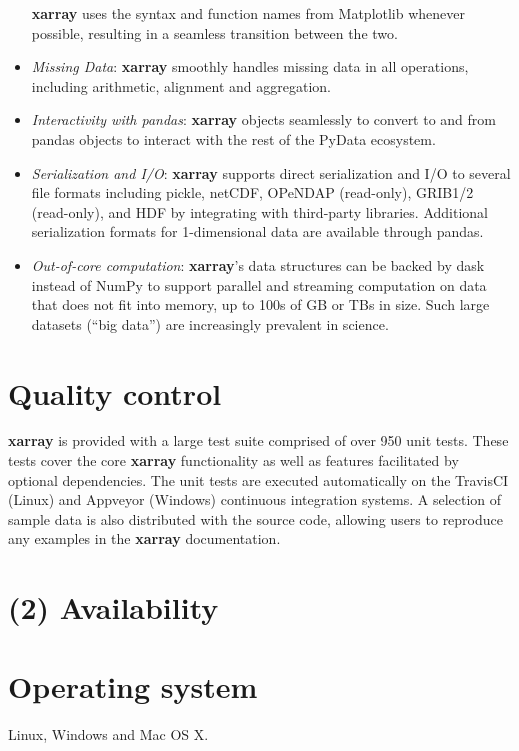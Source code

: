 \documentclass{jors}
\begin{document}
\begin{itemize}
	\textbf{xarray} uses the syntax and function names from Matplotlib whenever possible, resulting in a seamless transition between the two.
	\item \textit{Missing Data}: \textbf{xarray} smoothly handles missing data in all operations, including arithmetic, alignment and aggregation.
	\item \textit{Interactivity with pandas}: \textbf{xarray} objects seamlessly to convert to and from pandas objects to interact with the rest of the PyData ecosystem.
	\item \textit{Serialization and I/O}: \textbf{xarray} supports direct serialization and I/O to several file formats including pickle, netCDF, OPeNDAP (read-only), GRIB1/2 (read-only), and HDF by integrating with third-party libraries.
	Additional serialization formats for 1-dimensional data are available through pandas.
	\item \textit{Out-of-core computation}: \textbf{xarray}'s data structures can be backed by dask \cite{dask} instead of NumPy to support parallel and streaming computation on data that does not fit into memory, up to 100s of GB or TBs in size. Such large datasets (``big data'') are increasingly prevalent in science.
\end{itemize}

\section*{Quality control}

\textbf{xarray} is provided with a large test suite comprised of over 950 unit tests.
These tests cover the core \textbf{xarray} functionality as well as features facilitated by optional dependencies.
The unit tests are executed automatically on the TravisCI (Linux) \citep{TravisCI} and Appveyor (Windows) \citep{Appveyor} continuous integration systems.
A selection of sample data is also distributed with the source code, allowing users to reproduce any examples in the \textbf{xarray} documentation.

\section*{(2) Availability}
\vspace{0.5cm}
\section*{Operating system}

Linux, Windows and Mac OS X.
\end{document}
